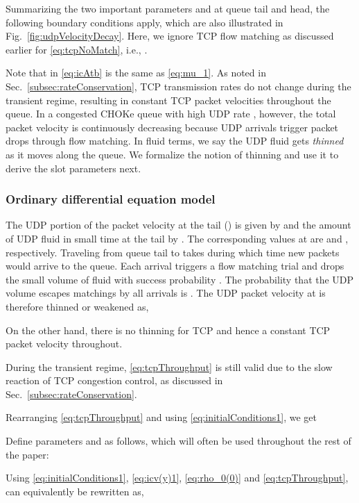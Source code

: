 \documentclass{IEEEtran}
\begin{document}
    Summarizing the two important parameters  and  at queue tail and head, the following boundary conditions apply, which are also illustrated in Fig.~\ref{fig:udpVelocityDecay}. Here, we ignore TCP flow matching as discussed earlier for \eqref{eq:tcpNoMatch}, i.e., .

        
    

       Note that  in \eqref{eq:icAtb} is the same as \eqref{eq:mu_1}.  As noted in Sec.~\ref{subsec:rateConservation}, TCP transmission rates do not change during the transient regime, resulting in constant TCP packet velocities throughout the queue. In a congested CHOKe queue with high UDP rate , however, the total packet velocity  is continuously decreasing because UDP arrivals trigger packet drops through flow matching. In fluid terms, we say the UDP fluid gets \emph{thinned} as it moves along the queue. We formalize the notion of thinning and use it to derive the slot parameters next.

       \subsubsection{Ordinary differential equation model}\label{subsec:ode}
The UDP portion of the packet velocity at the tail () is given by  and the amount of UDP fluid in small time  at the tail by . The corresponding values at  are  and , respectively. Traveling from queue tail to  takes  during which time  new packets would arrive to the queue. Each arrival triggers a flow matching trial and drops the small volume of fluid with success probability . The probability that the UDP volume escapes matchings by all arrivals  is . The UDP packet velocity at  is therefore thinned or weakened as,
    
    On the other hand, there is no thinning for TCP and hence a constant  TCP packet velocity throughout. 

    During the transient regime, \eqref{eq:tcpThroughput} is still valid due to the slow reaction of TCP congestion control, as discussed in Sec.~\ref{subsec:rateConservation}.

    Rearranging \eqref{eq:tcpThroughput} and using \eqref{eq:initialConditions1}, we get
    


Define parameters  and  as follows, which will often be used throughout the rest of the paper:
    

    Using \eqref{eq:initialConditions1}, \eqref{eq:icv(y)1}, \eqref{eq:rho_0(0)} and \eqref{eq:tcpThroughput},  can equivalently be rewritten as,
\end{document}
